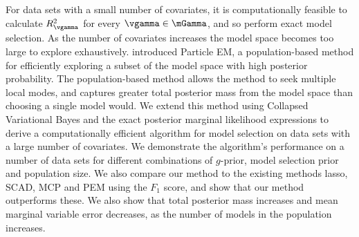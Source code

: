 \documentclass{article}
\begin{document}
For data sets with a small number of covariates, it is computationally feasible to calculate $R_\vgamma^2$ for
every $\vgamma \in \mGamma$, and so perform exact model selection. As the number of covariates increases the
model space becomes too large to explore exhaustively. \cite{Rockova2016} introduced Particle EM, a
population-based method for efficiently exploring a  subset of the model space with high posterior
probability. The population-based method allows the method to seek multiple local modes, and captures greater
total posterior mass from the model space than choosing a single model would. We extend this method using
Collapsed Variational Bayes and the exact posterior marginal likelihood expressions to derive a
computationally efficient algorithm for model selection on data sets with a large number of covariates. We
demonstrate the algorithm's performance on a number of data sets for different combinations of $g$-prior,
model selection prior and population size. We also compare our method to the existing methods lasso, SCAD, MCP
and PEM using the $F_1$ score,  and show that our method outperforms these. We also show that total posterior
mass increases and mean marginal variable error decreases, as the number of models in the population
increases.



\end{document}
